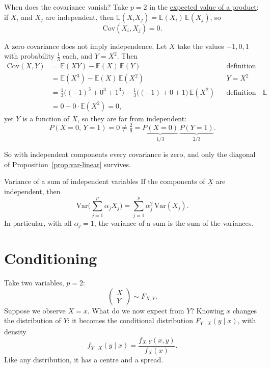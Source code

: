 \documentclass[a4paper,12pt,oneside]{report}
\begin{document}
When does the covariance vanish? Take $p=2$ in the
\hyperref[prop:product]{expected value of a product}: if $X_i$ and $X_j$
are independent, then $\mathbb{E}(X_iX_j)=\mathbb{E}(X_i)\,\mathbb{E}(X_j)$,
so
\[
\mathrm{Cov}(X_i,X_j)=0 .
\]

\begin{notebox}
\label{note:cov-converse}%
A zero covariance does not imply independence. Let $X$ take the values
$-1,0,1$ with probability $\tfrac13$ each, and $Y=X^2$. Then
\begin{align*}
\mathrm{Cov}(X,Y)
&=\mathbb{E}(XY)-\mathbb{E}(X)\,\mathbb{E}(Y)
&&\text{definition of covariance}\\
&=\mathbb{E}(X^3)-\mathbb{E}(X)\,\mathbb{E}(X^2)
&&Y=X^2\\
&=\tfrac13\big((-1)^3+0^3+1^3\big)-\tfrac13\big((-1)+0+1\big)\,\mathbb{E}(X^2)
&&\text{definition of }\mathbb{E}\\
&=0-0\cdot\mathbb{E}(X^2)=0,
\end{align*}
yet $Y$ is a function of $X$, so they are far from independent:
\[
P(X=0,\,Y=1)=0\ne\tfrac29=\underbrace{P(X=0)}_{1/3}\,\underbrace{P(Y=1)}_{2/3}.
\]
\end{notebox}

So with independent components every covariance is zero, and only the
diagonal of Proposition~\ref{prop:var-linear} survives.

\begin{framedcor}{Variance of a sum of independent variables}\label{cor:var-independent}
If the components of $\underline{X}$ are independent, then
\[
\mathrm{Var}\Big(\sum_{j=1}^p\alpha_jX_j\Big)=\sum_{j=1}^p\alpha_j^2\,\mathrm{Var}(X_j).
\]
In particular, with all $\alpha_j=1$, the variance of a sum is the sum of
the variances.
\end{framedcor}

\section{Conditioning}\label{sec:conditioning}

Take two variables, $p=2$:
\[
\begin{pmatrix}X\\ Y\end{pmatrix}\sim F_{X,Y}.
\]
Suppose we observe $X=x$. What do we now expect from $Y$? Knowing $x$
changes the distribution of $Y$: it becomes the conditional distribution
$F_{Y\mid X}(y\mid x)$, with density
\[
f_{Y\mid X}(y\mid x)=\frac{f_{X,Y}(x,y)}{f_X(x)} .
\]
Like any distribution, it has a centre and a spread.
\end{document}
